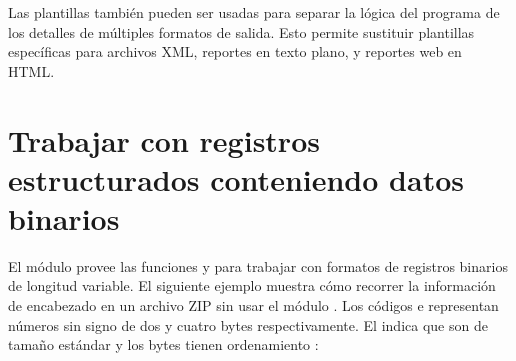\documentclass[a4,10pt,spanish]{sphinxmanual}
\begin{document}
\begin{sphinxVerbatim}[commandchars=\\\{\}]
\end{sphinxVerbatim}

\sphinxAtStartPar
Las plantillas también pueden ser usadas para separar la lógica del programa de los detalles de múltiples formatos de salida.  Esto permite sustituir plantillas específicas para archivos XML, reportes en texto plano, y reportes web en HTML.


\section{Trabajar con registros estructurados conteniendo datos binarios}
\label{\detokenize{tutorial/stdlib2:working-with-binary-data-record-layouts}}\label{\detokenize{tutorial/stdlib2:tut-binary-formats}}
\sphinxAtStartPar
El módulo  provee las funciones  y  para trabajar con formatos de registros binarios de longitud variable.  El siguiente ejemplo muestra cómo recorrer la información de encabezado en un archivo ZIP sin usar el módulo .  Los códigos  e  representan números sin signo de dos y cuatro bytes respectivamente.  El  indica que son de tamaño estándar y los bytes tienen ordenamiento :
\end{document}
